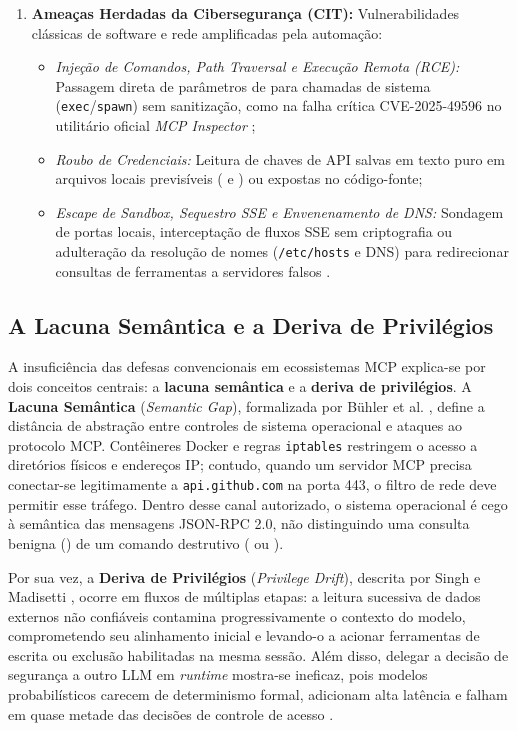 \begin{enumerate}
  \item \textbf{Ameaças Herdadas da Cibersegurança (CIT):} Vulnerabilidades clássicas de software e rede amplificadas pela automação:
  \begin{itemize}
    \item \textit{Injeção de Comandos, \textit{Path Traversal} e Execução Remota (RCE):} Passagem direta de parâmetros de  para chamadas de sistema (\texttt{exec}/\texttt{spawn}) sem sanitização, como na falha crítica CVE-2025-49596 no utilitário oficial \textit{MCP Inspector} \cite{hasan2026mcp};
    \item \textit{Roubo de Credenciais:} Leitura de chaves de API salvas em texto puro em arquivos locais previsíveis ( e ) ou expostas no código-fonte;
    \item \textit{Escape de Sandbox, Sequestro SSE e Envenenamento de DNS:} Sondagem de portas locais, interceptação de fluxos SSE sem criptografia ou adulteração da resolução de nomes (\texttt{/etc/hosts} e DNS) para redirecionar consultas de ferramentas a servidores falsos \cite{jang2026hierarchical}.
  \end{itemize}
\end{enumerate}

\subsection{A Lacuna Semântica e a Deriva de Privilégios}
\label{subsec:semantic_gap_drift}

A insuficiência das defesas convencionais em ecossistemas MCP explica-se por dois conceitos centrais: a \textbf{lacuna semântica} e a \textbf{deriva de privilégios}. A \textbf{Lacuna Semântica} (\textit{Semantic Gap}), formalizada por Bühler et al. \cite{buhler2026agentbound}, define a distância de abstração entre controles de sistema operacional e ataques ao protocolo MCP. Contêineres Docker e regras \texttt{iptables} restringem o acesso a diretórios físicos e endereços IP; contudo, quando um servidor MCP precisa conectar-se legitimamente a \texttt{api.github.com} na porta 443, o filtro de rede deve permitir esse tráfego. Dentro desse canal autorizado, o sistema operacional é cego à semântica das mensagens JSON-RPC 2.0, não distinguindo uma consulta benigna () de um comando destrutivo ( ou ).

Por sua vez, a \textbf{Deriva de Privilégios} (\textit{Privilege Drift}), descrita por Singh e Madisetti \cite{singh2026mcpsecure}, ocorre em fluxos de múltiplas etapas: a leitura sucessiva de dados externos não confiáveis contamina progressivamente o contexto do modelo, comprometendo seu alinhamento inicial e levando-o a acionar ferramentas de escrita ou exclusão habilitadas na mesma sessão. Além disso, delegar a decisão de segurança a outro LLM em \textit{runtime} mostra-se ineficaz, pois modelos probabilísticos carecem de determinismo formal, adicionam alta latência e falham em quase metade das decisões de controle de acesso \cite{zhang2025acfix}.


